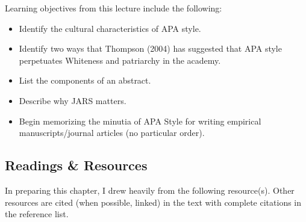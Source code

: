 \documentclass[
  11pt,
]{book}
\providecommand{\tightlist}{%
  \setlength{\itemsep}{0pt}\setlength{\parskip}{0pt}}
\begin{document}
Learning objectives from this lecture include the following:

\begin{itemize}
\tightlist
\item
  Identify the cultural characteristics of APA style.
\item
  Identify two ways that Thompson (2004) has suggested that APA style perpetuates Whiteness and patriarchy in the academy.
\item
  List the components of an abstract.
\item
  Describe why JARS matters.
\item
  Begin memorizing the minutia of APA Style for writing empirical manuscripts/journal articles (no particular order).
\end{itemize}

\hypertarget{readings-resources}{%
\subsection{Readings \& Resources}\label{readings-resources}}

In preparing this chapter, I drew heavily from the following resource(s). Other resources are cited (when possible, linked) in the text with complete citations in the reference list.
\end{document}
